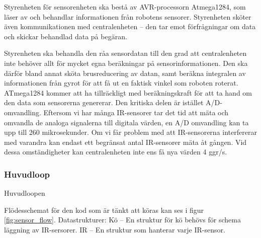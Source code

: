 \documentclass[a4paper,titlepage,12pt]{article}
\begin{document}
	Styrenheten för sensorenheten ska bestå av AVR-processorn Atmega1284, som läser av och 
	behandlar informationen från robotens sensorer. Styrenheten sköter även
	kommunikationen med centralenheten -- den tar emot förfrågningar om data och
	skickar behandlad data på begäran.

	Styrenheten ska behandla den råa sensordatan till den grad att
	centralenheten inte behöver allt för mycket egna beräkningar på
	sensorinformationen. Den ska därför bland annat sköta brusreducering av
	datan, samt beräkna integralen av informationen från gyrot för att få ut en
	faktisk vinkel som roboten roterat. ATmega1284 kommer att ha tillräckligt med 
	beräkningskraft för att ta hand om den data som sensorerna genererar. Den kritiska 
	delen är istället A/D-omvandling. Eftersom vi har många IR-sensorer tar det tid att 
	mäta och omvandla de analoga signalerna till digitala värden, en A/D omvandling kan ta 
	upp till 260 mikrosekunder. Om vi får problem med att IR-sensorerna interfererar med 
	varandra kan endast ett begränsat antal IR-sensorer mäta åt gången. Vid
    dessa omständigheter kan 
	centralenheten inte ens få nya värden 4 ggr/s. %

    \subsubsection{Huvudloop}
    Huvudloopen 

    Flödesschemat för den kod som är tänkt att köras kan ses i figur
    \ref{fig:sensor_flow}. 
	Datastrukturer:
	Kö -- En struktur för kö behövs för schema läggning av IR-sersorer. 
	IR -- En struktur som hanterar varje IR-sensor. 
    \newpage
\end{document}
